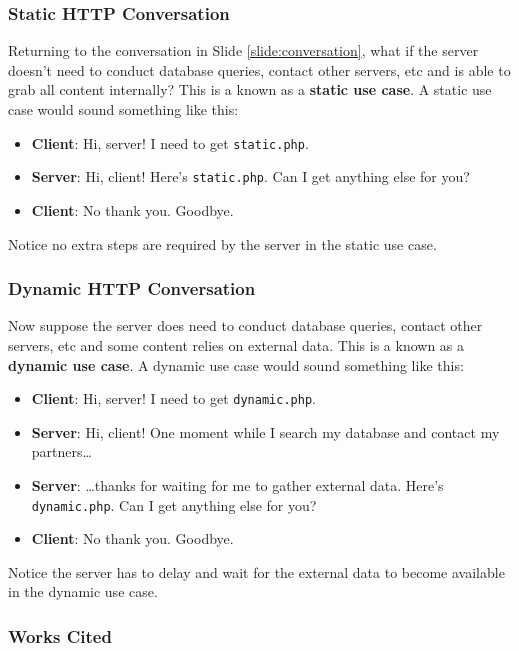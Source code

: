 \documentclass[aspectratio=169]{beamer}
\begin{document}
\begin{frame}
\frametitle{Static HTTP Conversation}
Returning to the conversation in Slide \ref{slide:conversation}, what if the server doesn't need to conduct database queries, contact other servers, etc and is able to grab all content internally? This is a known as a \textbf{static use case}. A static use case would sound something like this:
\begin{itemize}
	\item \textbf{Client}: Hi, server! I need to get \texttt{static.php}.
	\item \textbf{Server}: Hi, client! Here's \texttt{static.php}. Can I get anything else for you?
	\item \textbf{Client}: No thank you. Goodbye.
\end{itemize}
Notice no extra steps are required by the server in the static use case.
\end{frame}

\begin{frame}
\frametitle{Dynamic HTTP Conversation}
Now suppose the server does need to conduct database queries, contact other servers, etc and some content relies on external data. This is a known as a \textbf{dynamic use case}. A dynamic use case would sound something like this:
\begin{itemize}
	\item \textbf{Client}: Hi, server! I need to get \texttt{dynamic.php}.
	\item \textbf{Server}: Hi, client! One moment while I search my database and contact my partners\dots
	\item \textbf{Server}: \dots thanks for waiting for me to gather external data. Here's \texttt{dynamic.php}. Can I get anything else for you?
	\item \textbf{Client}: No thank you. Goodbye.
\end{itemize}
Notice the server has to delay and wait for the external data to become available in the dynamic use case.
\end{frame}

\begin{frame}
\frametitle{Works Cited}

\end{frame}
\end{document}
